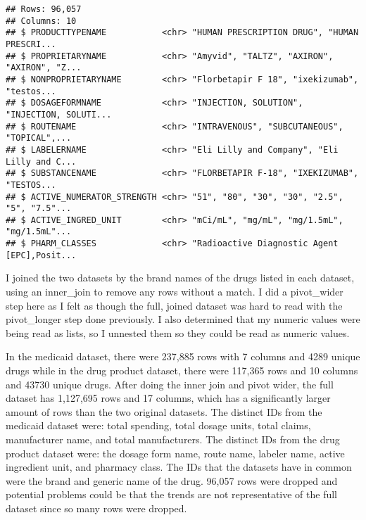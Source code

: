\documentclass[
]{article}
\newenvironment{Shaded}{\begin{snugshade}}{\end{snugshade}}
\newcommand{\DataTypeTok}[1]{\textcolor[rgb]{0.13,0.29,0.53}{#1}}
\newcommand{\KeywordTok}[1]{\textcolor[rgb]{0.13,0.29,0.53}{\textbf{#1}}}
\newcommand{\NormalTok}[1]{#1}
\newcommand{\OperatorTok}[1]{\textcolor[rgb]{0.81,0.36,0.00}{\textbf{#1}}}
\newcommand{\StringTok}[1]{\textcolor[rgb]{0.31,0.60,0.02}{#1}}
\begin{document}
\begin{Shaded}
\end{Shaded}

\begin{verbatim}
## Rows: 96,057
## Columns: 10
## $ PRODUCTTYPENAME           <chr> "HUMAN PRESCRIPTION DRUG", "HUMAN PRESCRI...
## $ PROPRIETARYNAME           <chr> "Amyvid", "TALTZ", "AXIRON", "AXIRON", "Z...
## $ NONPROPRIETARYNAME        <chr> "Florbetapir F 18", "ixekizumab", "testos...
## $ DOSAGEFORMNAME            <chr> "INJECTION, SOLUTION", "INJECTION, SOLUTI...
## $ ROUTENAME                 <chr> "INTRAVENOUS", "SUBCUTANEOUS", "TOPICAL",...
## $ LABELERNAME               <chr> "Eli Lilly and Company", "Eli Lilly and C...
## $ SUBSTANCENAME             <chr> "FLORBETAPIR F-18", "IXEKIZUMAB", "TESTOS...
## $ ACTIVE_NUMERATOR_STRENGTH <chr> "51", "80", "30", "30", "2.5", "5", "7.5"...
## $ ACTIVE_INGRED_UNIT        <chr> "mCi/mL", "mg/mL", "mg/1.5mL", "mg/1.5mL"...
## $ PHARM_CLASSES             <chr> "Radioactive Diagnostic Agent [EPC],Posit...
\end{verbatim}

I joined the two datasets by the brand names of the drugs listed in each
dataset, using an inner\_join to remove any rows without a match. I did
a pivot\_wider step here as I felt as though the full, joined dataset
was hard to read with the pivot\_longer step done previously. I also
determined that my numeric values were being read as lists, so I
unnested them so they could be read as numeric values.

In the medicaid dataset, there were 237,885 rows with 7 columns and 4289
unique drugs while in the drug product dataset, there were 117,365 rows
and 10 columns and 43730 unique drugs. After doing the inner join and
pivot wider, the full dataset has 1,127,695 rows and 17 columns, which
has a significantly larger amount of rows than the two original
datasets. The distinct IDs from the medicaid dataset were: total
spending, total dosage units, total claims, manufacturer name, and total
manufacturers. The distinct IDs from the drug product dataset were: the
dosage form name, route name, labeler name, active ingredient unit, and
pharmacy class. The IDs that the datasets have in common were the brand
and generic name of the drug. 96,057 rows were dropped and potential
problems could be that the trends are not representative of the full
dataset since so many rows were dropped.
\end{document}
